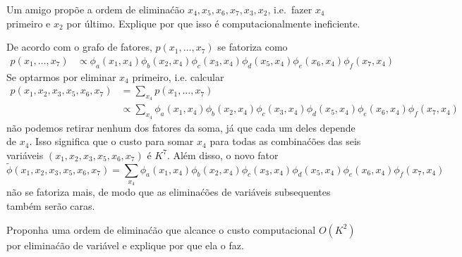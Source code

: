 \begin{exenumerate}
    \item Um amigo prop\~oe a ordem de elimina\'c\~ao $x_4, x_5, x_6, x_7, x_3, x_2$, i.e.\ fazer $x_4$ primeiro e $x_2$ por \'ultimo. Explique por que isso \'e computacionalmente ineficiente.
    
    \begin{solution}
        
        De acordo com o grafo de fatores, $p(x_1, \ldots, x_7)$ se fatoriza como
        \begin{align}
            p(x_1, \ldots, x_7) &\propto \phi_a(x_1,x_4)\phi_b(x_2,x_4)\phi_c(x_3,x_4)\phi_d(x_5,x_4)\phi_e(x_6,x_4)\phi_f(x_7,x_4)
        \end{align}
        Se optarmos por eliminar $x_4$ primeiro, i.e. calcular
        \begin{align}
            p(x_1,x_2,x_3,x_5, x_6, x_7) &= \sum_{x_4}   p(x_1, \ldots, x_7) \\
            & \propto \sum_{x_4} \phi_a(x_1,x_4)\phi_b(x_2,x_4)\phi_c(x_3,x_4)\phi_d(x_5,x_4)\phi_e(x_6,x_4)\phi_f(x_7,x_4)
        \end{align}
        n\~ao podemos retirar nenhum dos fatores da soma, j\'a que cada um deles depende de $x_4$. Isso significa que o custo para somar $x_4$ para todas as combina\'c\~oes das seis vari\'aveis $(x_1,x_2,x_3,x_5, x_6, x_7)$ \'e $K^7$. Al\'em disso, o novo fator
        \begin{equation}
            \tilde{\phi}(x_1,x_2,x_3,x_5, x_6, x_7) =  \sum_{x_4} \phi_a(x_1,x_4)\phi_b(x_2,x_4)\phi_c(x_3,x_4)\phi_d(x_5,x_4)\phi_e(x_6,x_4)\phi_f(x_7,x_4)
        \end{equation}
        n\~ao se fatoriza mais, de modo que as elimina\'c\~oes de vari\'aveis subsequentes tamb\'em ser\~ao caras.
    \end{solution}
    
    \item Proponha uma ordem de elimina\'c\~ao que alcance o custo computacional $O(K^2)$ por elimina\'c\~ao de vari\'avel e explique por que ela o faz.
    
    \begin{solution}
        

\end{solution}
\end{exenumerate}
